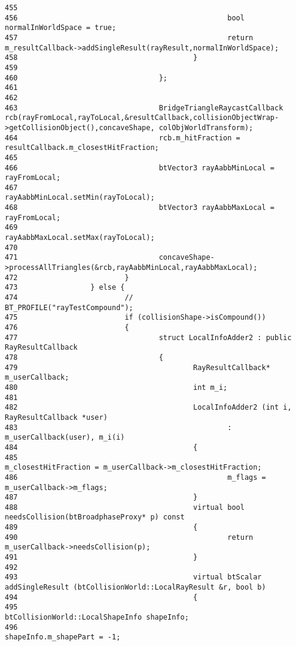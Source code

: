 \begin{Code}
\begin{verbatim}
455 
456                                                 bool    normalInWorldSpace = true;
457                                                 return m_resultCallback->addSingleResult(rayResult,normalInWorldSpace);
458                                         }
459 
460                                 };
461 
462 
463                                 BridgeTriangleRaycastCallback   rcb(rayFromLocal,rayToLocal,&resultCallback,collisionObjectWrap->getCollisionObject(),concaveShape, colObjWorldTransform);
464                                 rcb.m_hitFraction = resultCallback.m_closestHitFraction;
465 
466                                 btVector3 rayAabbMinLocal = rayFromLocal;
467                                 rayAabbMinLocal.setMin(rayToLocal);
468                                 btVector3 rayAabbMaxLocal = rayFromLocal;
469                                 rayAabbMaxLocal.setMax(rayToLocal);
470 
471                                 concaveShape->processAllTriangles(&rcb,rayAabbMinLocal,rayAabbMaxLocal);
472                         }
473                 } else {
474                         //                      BT_PROFILE("rayTestCompound");
475                         if (collisionShape->isCompound())
476                         {
477                                 struct LocalInfoAdder2 : public RayResultCallback
478                                 {
479                                         RayResultCallback* m_userCallback;
480                                         int m_i;
481                                         
482                                         LocalInfoAdder2 (int i, RayResultCallback *user)
483                                                 : m_userCallback(user), m_i(i)
484                                         { 
485                                                 m_closestHitFraction = m_userCallback->m_closestHitFraction;
486                                                 m_flags = m_userCallback->m_flags;
487                                         }
488                                         virtual bool needsCollision(btBroadphaseProxy* p) const
489                                         {
490                                                 return m_userCallback->needsCollision(p);
491                                         }
492 
493                                         virtual btScalar addSingleResult (btCollisionWorld::LocalRayResult &r, bool b)
494                                         {
495                                                 btCollisionWorld::LocalShapeInfo shapeInfo;
496                                                 shapeInfo.m_shapePart = -1;

\end{verbatim}
\end{Code}
